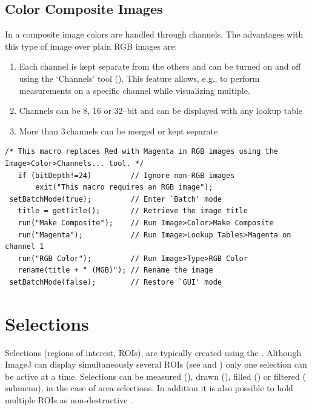\subsection*{Color Composite Images\label{sub:Color-Composites}}

In a composite image colors are handled through
channels. The advantages with this type of image over plain RGB images
are: 
\begin{enumerate}
\item Each channel is kept separate from the others and can be turned on
and off using the `Channels' tool (\textsf{}).
This feature allows, e.g., to perform measurements on a specific channel
while visualizing multiple. 
\item Channels can be 8, 16 or 32--bit and can be displayed with any lookup
table
\item More than 3\,channels can be merged or kept separate
\end{enumerate}
\begin{lstlisting}[caption={Replace\,Red\,with\,Magenta.ijm (Using \protect\userinterface{Image\lyxarrow{}Color\lyxarrow{}Channels\ldots{}})},label={lis:RGBtoMGB1},float=h,showstringspaces=false,tabsize=4]
 /* This macro replaces Red with Magenta in RGB images using the Image>Color>Channels... tool. */
   if (bitDepth!=24)         // Ignore non-RGB images
       exit("This macro requires an RGB image");
 setBatchMode(true);         // Enter `Batch' mode
   title = getTitle();       // Retrieve the image title
   run("Make Composite");    // Run Image>Color>Make Composite
   run("Magenta");           // Run Image>Lookup Tables>Magenta on channel 1
   run("RGB Color");         // Run Image>Type>RGB Color
   rename(title + " (MGB)"); // Rename the image
 setBatchMode(false);        // Restore `GUI' mode
\end{lstlisting}



\section{Selections\label{sec:Selections-Intro}}

Selections (regions of interest, ROIs),
are typically created using the  .
Although ImageJ can display simultaneously several ROIs
(see  and )
only one selection can be active at a time. Selections can be measured
(\textsf{}),
drawn (),
filled (\textsf{})
or filtered (
submenu), in the case of area selections. In addition it is also possible
to hold multiple ROIs as non-destructive .


